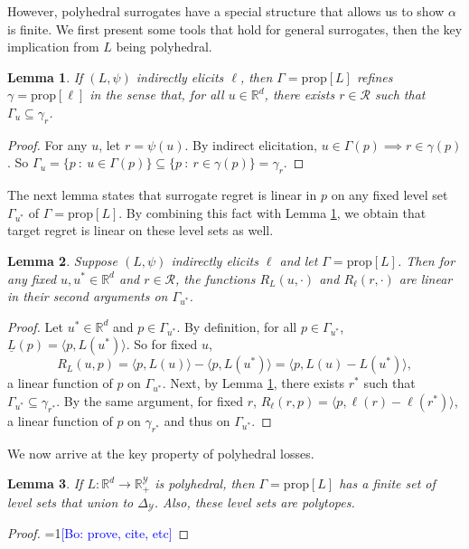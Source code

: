 \documentclass{article}
\newtheorem{lemma}{Lemma}
\theoremstyle{definition}\newtheorem{definition}{Definition}
\theoremstyle{definition}\newtheorem{assumption}{Assumption}
\newcommand{\Comments}{1}
\newcommand{\mynote}[2]{\ifnum\Comments=1\textcolor{#1}{#2}\fi}
\newcommand{\mytodo}[2]{\ifnum\Comments=1%
  \todo[linecolor=#1!80!black,backgroundcolor=#1,bordercolor=#1!80!black]{#2}\fi}
\newcommand{\raft}[1]{\mytodo{green!20!white}{RF: #1}}
\newcommand{\bo}[1]{\mynote{blue}{[Bo: #1]}}
\newcommand{\reals}{\mathbb{R}}
\newcommand{\prop}[1]{\mathrm{prop}[#1]}
\newcommand{\simplex}{\Delta_\Y}
\newcommand{\R}{\mathcal{R}}
\newcommand{\Y}{\mathcal{Y}}
\newcommand{\risk}[1]{\underline{#1}}
\newcommand{\inprod}[2]{\langle #1, #2 \rangle}%
\begin{document}
However, polyhedral surrogates have a special structure that allows us to show $\alpha$ is finite.
We first present some tools that hold for general surrogates, then the key implication from $L$ being polyhedral.

\begin{lemma} \label{lemma:refines}
  If $(L,\psi)$ indirectly elicits $\ell$, then $\Gamma = \prop{L}$ \emph{refines} $\gamma = \prop{\ell}$ in the sense that, for all $u \in \reals^d$, there exists $r \in \R$ such that $\Gamma_u \subseteq \gamma_r$.
\end{lemma}
\begin{proof}
  For any $u$, let $r = \psi(u)$.
  By indirect elicitation, $u \in \Gamma(p) \implies r \in \gamma(p)$.
  So $\Gamma_u = \{p ~:~ u \in \Gamma(p)\} \subseteq \{p ~:~ r \in \gamma(p)\} = \gamma_r$.
\end{proof}
The next lemma states that surrogate regret is linear in $p$ on any fixed level set $\Gamma_{u^*}$ of $\Gamma = \prop{L}$.
By combining this fact with Lemma \ref{lemma:refines}, we obtain that target regret is linear on these level sets as well.
\begin{lemma} \label{lemma:linear-on-levelset}
  Suppose $(L,\psi)$ indirectly elicits $\ell$ and let $\Gamma = \prop{L}$.
  Then for any fixed $u,u^* \in \reals^d$ and $r \in \R$, the functions $R_L(u,\cdot)$ and $R_{\ell}(r,\cdot)$ are linear in their second arguments on $\Gamma_{u^*}$.
\end{lemma}
\begin{proof}
  Let $u^* \in \reals^d$ and $p \in \Gamma_{u^*}$.
  By definition, for all $p \in \Gamma_{u^*}$, $\risk{L}(p) = \inprod{p}{L(u^*)}$.
  So for fixed $u$,
    \[ R_L(u,p) = \inprod{p}{L(u)} - \inprod{p}{L(u^*)} = \inprod{p}{L(u) - L(u^*)} , \]
  a linear function of $p$ on $\Gamma_{u^*}$.
  Next, by Lemma \ref{lemma:refines}, there exists $r^*$ such that $\Gamma_{u^*} \subseteq \gamma_{r^*}$.
  By the same argument, for fixed $r$, $R_{\ell}(r,p) = \inprod{p}{\ell(r) - \ell(r^*)}$, a linear function of $p$ on $\gamma_{r^*}$ and thus on $\Gamma_{u^*}$.
\end{proof}

We now arrive at the key property of polyhedral losses.
\begin{lemma} \label{lemma:polyhedral-finite}
  If $L: \reals^d \to \reals_+^{\Y}$ is polyhedral, then $\Gamma = \prop{L}$ has a finite set of level sets that union to $\simplex$. Also, these level sets are polytopes.
\end{lemma}
\begin{proof}
  \bo{prove, cite, etc}
\end{proof}
\end{document}
